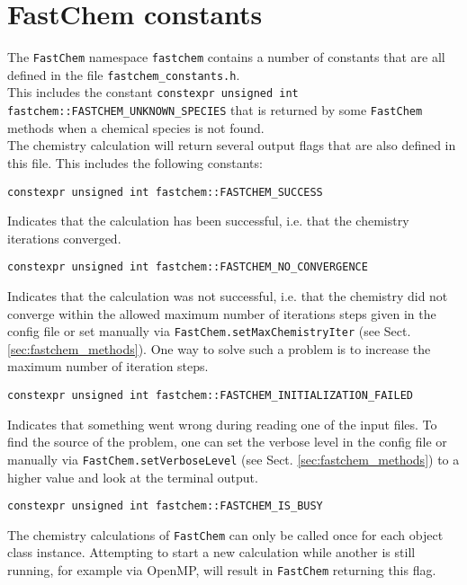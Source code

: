 \documentclass[numbers=noenddot]{aux/fcmanual}
\newcommand{\fc}{\texttt{FastChem}\xspace}
\begin{document}
\section{FastChem constants}
\label{sec:fastchem_constants}

The \fc namespace \lstinline!fastchem! contains a number of constants that are all defined in the file \verb|fastchem_constants.h|.\\ This includes the constant \lstinline!constexpr unsigned int fastchem::FASTCHEM_UNKNOWN_SPECIES! that is returned by some \fc methods when a chemical species is not found. \\

The chemistry calculation will return several output flags that are also defined in this file. This includes the following constants:

\lstinline!constexpr unsigned int fastchem::FASTCHEM_SUCCESS!
\begin{addmargin}[25pt]{0pt}
  Indicates that the calculation has been successful, i.e. that the chemistry iterations converged.
\end{addmargin}

\bigbreak

\lstinline!constexpr unsigned int fastchem::FASTCHEM_NO_CONVERGENCE!
\begin{addmargin}[25pt]{0pt}
  Indicates that the calculation was not successful, i.e. that the chemistry did not converge within the allowed maximum number of iterations steps given in the config file or set manually via \lstinline!FastChem.setMaxChemistryIter! (see Sect. \ref{sec:fastchem_methods}). One way to solve such a problem is to increase the maximum number of iteration steps.
\end{addmargin}

\bigbreak

\lstinline!constexpr unsigned int fastchem::FASTCHEM_INITIALIZATION_FAILED!
\begin{addmargin}[25pt]{0pt}
  Indicates that something went wrong during reading one of the input files. To find the source of the problem, one can set the verbose level in the config file or manually via \lstinline!FastChem.setVerboseLevel! (see Sect. \ref{sec:fastchem_methods}) to a higher value and look at the terminal output.
\end{addmargin}

\bigbreak

\lstinline!constexpr unsigned int fastchem::FASTCHEM_IS_BUSY!
\begin{addmargin}[25pt]{0pt}
  The chemistry calculations of \fc can only be called once for each object class instance. Attempting to start a new calculation while another is still running, for example via OpenMP, will result in \fc returning this flag.
\end{addmargin}
\end{document}
